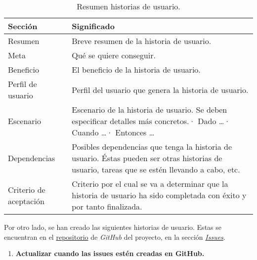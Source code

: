 \begin{table}[H]
    \centering
    \def\arraystretch{1.25}
    \begin{adjustbox}{max width=\textwidth}
    \begin{tabularx}{\textwidth}{|l|L|}
    \hline
        \textbf{Sección} & \textbf{Significado} \\ \hline
    \hline
        Resumen & Breve resumen de la historia de usuario. \\ \hline
        Meta & Qué se quiere conseguir. \\ \hline
        Beneficio & El beneficio de la historia de usuario. \\ \hline
        Perfil de usuario & Perfil del usuario que genera la historia de usuario. \\ \hline
        Escenario & Escenario de la historia de usuario. Se deben especificar detalles más concretos.\linebreak · Dado …\linebreak · Cuando …\linebreak · Entonces … \\ \hline
        Dependencias & Posibles dependencias que tenga la historia de usuario. Éstas pueden ser otras historias de usuario, tareas que se estén llevando a cabo, etc. \\ \hline
        Criterio de aceptación & Criterio por el cual se va a determinar que la historia de usuario ha sido completada con éxito y por tanto finalizada. \\ \hline
    \end{tabularx}
    \end{adjustbox}
    \caption{Resumen historias de usuario.}
\end{table}

\bigskip

Por otro lado, se han creado las siguientes historias de usuario. Estas se encuentran en el \href{https://github.com/harvestcore/matroos}{repositorio} de \textit{GitHub} del proyecto, en la sección \href{https://github.com/harvestcore/matroos/labels/US}{\textit{Issues}}.

\begin{enumerate}
	\item \textbf{Actualizar cuando las issues estén creadas en GitHub.}
\end{enumerate}


